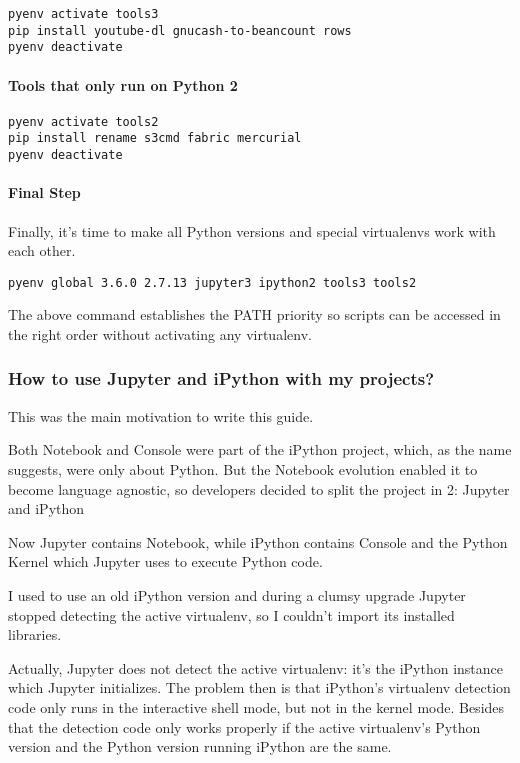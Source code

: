 \documentclass[11pt]{article}
\begin{document}
\begin{verbatim}
pyenv activate tools3
pip install youtube-dl gnucash-to-beancount rows 
pyenv deactivate
\end{verbatim}

\paragraph{Tools that only run on Python 2}
\label{sec:org32abd8e}

\begin{verbatim}
pyenv activate tools2
pip install rename s3cmd fabric mercurial
pyenv deactivate
\end{verbatim}

\paragraph{Final Step}
\label{sec:orgacb6a92}
Finally, it's time to make all Python versions and special virtualenvs work with each other.

\begin{verbatim}
pyenv global 3.6.0 2.7.13 jupyter3 ipython2 tools3 tools2
\end{verbatim}

The above command establishes the PATH priority so scripts can be accessed in the right order without activating any virtualenv.

\subsubsection{How to use Jupyter and iPython with my projects?}
\label{sec:org7613ec9}

This was the main motivation to write this guide.

Both Notebook and Console were part of the iPython project, which, as the name suggests, were only about Python. But the Notebook evolution enabled it to become language agnostic, so developers decided to split the project in 2: Jupyter and iPython

Now Jupyter contains Notebook, while iPython contains Console and the Python Kernel which Jupyter uses to execute Python code.

I used to use an old iPython version and during a clumsy upgrade Jupyter stopped detecting the active virtualenv, so I couldn't import its installed libraries.

Actually, Jupyter does not detect the active virtualenv: it's the iPython instance which Jupyter initializes. The problem then is that iPython's virtualenv detection code only runs in the interactive shell mode, but not in the kernel mode. Besides that the detection code only works properly if the active virtualenv's Python version and the Python version running iPython are the same.
\end{document}
